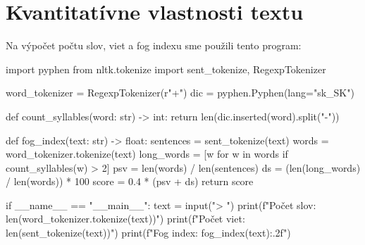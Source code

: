 \thispagestyle{empty}
\chapter{Kvantitatívne vlastnosti textu}
\renewcommand*{\thepage}{A-\arabic{page}}

Na výpočet počtu slov, viet a fog indexu sme použili tento program:
\begin{solution}
import pyphen
from nltk.tokenize import sent_tokenize, RegexpTokenizer

word_tokenizer = RegexpTokenizer(r"\w+")
dic = pyphen.Pyphen(lang="sk_SK")

def count_syllables(word: str) -> int:
    return len(dic.inserted(word).split("-"))

def fog_index(text: str) -> float:
    sentences = sent_tokenize(text)
    words = word_tokenizer.tokenize(text)
    long_words = [w for w in words if count_syllables(w) > 2]
    psv = len(words) / len(sentences)
    ds = (len(long_words) / len(words)) * 100
    score = 0.4 * (psv + ds)
    return score

if __name__ == "__main__":
    text = input("> ")
    print(f"Počet slov: {len(word_tokenizer.tokenize(text))}")
    print(f"Počet viet: {len(sent_tokenize(text))}")
    print(f"Fog index: {fog_index(text):.2f}")
\end{solution}